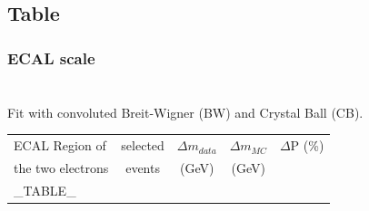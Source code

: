 








\subsection{Table}
\color{titlecolor}
\usebackgroundtemplate{
	\texttt{[image: ]}%
}
\begin{frame}
  \frametitle{ECAL scale}
  \framesubtitle{\invMassVarName }
\\
  Fit with convoluted Breit-Wigner (BW) and Crystal Ball (CB).


  
  \begin{center}
    \emph{\dataSample}\xspace \invMassVarName

    \begin{tabular}{|l|c|*{3}{c|}} \hline
      ECAL Region of & selected  & $\Delta m_{data}$ & $\Delta m_{MC}$  & $\Delta$P (\%) \\
      the two electrons & events & (GeV) & (GeV) & \\
      \hline
      \hline
      _TABLE_
      \hline		
    \end{tabular}
  \end{center}


\end{frame}


